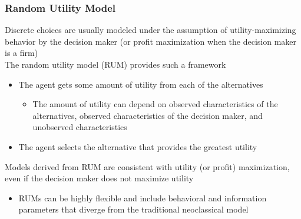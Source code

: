 \documentclass{beamer}\usepackage[]{graphicx}\usepackage[]{xcolor}
\begin{document}
\begin{frame}\frametitle{Random Utility Model}
    Discrete choices are usually modeled under the assumption of utility-maximizing behavior by the decision maker (or profit maximization when the decision maker is a firm) \\
    \vspace{2ex} 
    The random utility model (RUM) provides such a framework
    \begin{itemize}
    	\item The agent gets some amount of utility from each of the alternatives
    	\begin{itemize}
    		\item The amount of utility can depend on observed characteristics of the alternatives, observed characteristics of the decision maker, and unobserved characteristics
    	\end{itemize}
    	\item The agent selects the alternative that provides the greatest utility
    \end{itemize}
    \vspace{2ex}
    Models derived from RUM are consistent with utility (or profit) maximization, even if the decision maker does not maximize utility
    \begin{itemize}
    	\item RUMs can be highly flexible and include behavioral and information parameters that diverge from the traditional neoclassical model
    \end{itemize}
\end{frame}
\end{document}
